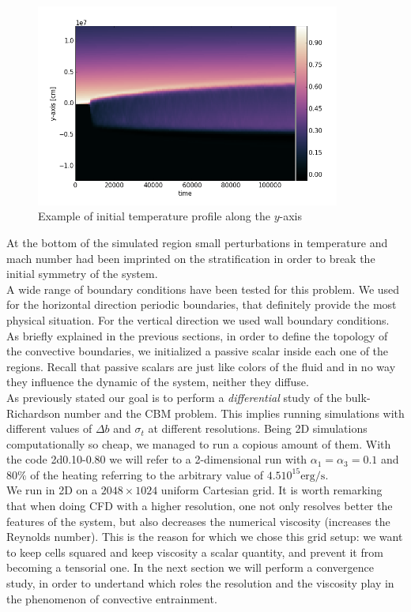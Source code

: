 \begin{figure}[t]
\centering
\includegraphics[width=10cm]{./img/tempprofile}
\caption{Example of initial temperature profile along the $y$-axis}
\label{fig:tempprofile}
\centering
\end{figure}
At the bottom of the simulated region small perturbations in temperature and mach number had been imprinted on the stratification in order to break the initial symmetry of the system.\\
A wide range of boundary conditions have been tested for this problem. We used for the horizontal direction periodic boundaries, that definitely provide the most physical situation. For the vertical direction we used wall boundary conditions.\\ 
As briefly explained in the previous sections, in order to define the topology of the convective boundaries, we initialized a passive scalar inside each one of the regions. Recall that passive scalars are just like colors of the fluid and in no way they influence the dynamic of the system, neither they diffuse.\\
As previously stated our goal is to perform a \textit{differential} study of the bulk-Richardson number and the CBM problem. This implies running simulations with different values of $\Delta b$ and $\sigma_t$ at different resolutions. Being 2D simulations computationally so cheap, we managed to run a copious amount of them. With the code 2d0.10-0.80 we will refer to a 2-dimensional run with $\alpha_{1} = \alpha_{3}=0.1$ and $80 \%$ of the heating referring to the arbitrary value of $4.5 10^{15} \mathrm{erg/s}$.\\ 
We run in 2D on a $2048 \times 1024$ uniform Cartesian grid. It is worth remarking that when doing CFD with a higher resolution, one not only resolves better the features of the system, but also decreases the numerical viscosity (increases the Reynolds number). This is the reason for which we chose this grid setup: we want to keep cells squared and keep viscosity a scalar quantity, and prevent it from becoming a tensorial one. In the next section we will perform a convergence study, in order to undertand which roles the resolution and the viscosity play in the phenomenon of convective entrainment.\\ 

